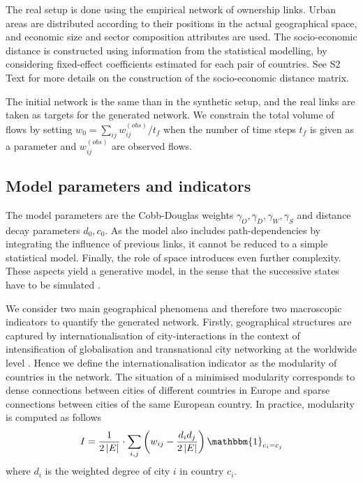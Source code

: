 \documentclass[10pt,letterpaper]{article}
\begin{document}
The real setup is done using the empirical network of ownership links. Urban areas are distributed according to their positions in the actual geographical space, and economic size and sector composition attributes are used. The socio-economic distance is constructed using information from the statistical modelling, by considering fixed-effect coefficients estimated for each pair of countries. See S2 Text for more details on the construction of the socio-economic distance matrix.

The initial network is the same than in the synthetic setup, and the real links are taken as targets for the generated network. We constrain the total volume of flows by setting $w_0 = \sum_{ij} w_{ij}^{(obs)} / t_{f}$ when the number of time steps $t_f$ is given as a parameter and $w_{ij}^{(obs)}$ are observed flows.

\subsection*{Model parameters and indicators}

The model parameters are the Cobb-Douglas weights $\gamma_O,\gamma_D,\gamma_W,\gamma_S$ and distance decay parameters $d_0,c_0$. As the model also includes path-dependencies by integrating the influence of previous links, it cannot be reduced to a simple statistical model. Finally, the role of space introduces even further complexity. These aspects yield a generative model, in the sense that the successive states have to be simulated \cite{epstein1999agent}.

We consider two main geographical phenomena and therefore two macroscopic indicators to quantify the generated network. Firstly, geographical structures are captured by internationalisation of city-interactions in the context of intensification of globalisation and transnational city networking at the worldwide level \cite{taylor2001specification}. Hence we define the internationalisation indicator as the modularity of countries in the network. The situation of a minimised modularity corresponds to dense connections between cities of different countries in Europe and sparse connections between cities of the same European country. In practice, modularity is computed as follows
\begin{equation}
    I = \frac{1}{2 \left|E\right|} \cdot \sum_{i,j} \left(w_{ij} - \frac{d_i d_j}{2 \left|E\right|}\right) \mathbbm{1}_{c_i = c_j}
\end{equation}
where $d_i$ is the weighted degree of city $i$ in country $c_i$.
\end{document}
